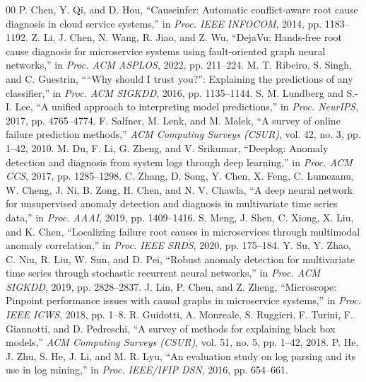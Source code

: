\documentclass[conference]{IEEEtran}
\begin{document}
\begin{thebibliography}{00}
 P. Chen, Y. Qi, and D. Hou, ``Causeinfer: Automatic conflict-aware root cause diagnosis in cloud service systems,'' in \textit{Proc. IEEE INFOCOM}, 2014, pp. 1183--1192.
 Z. Li, J. Chen, N. Wang, R. Jiao, and Z. Wu, ``DejaVu: Hands-free root cause diagnosis for microservice systems using fault-oriented graph neural networks,'' in \textit{Proc. ACM ASPLOS}, 2022, pp. 211--224.
 M. T. Ribeiro, S. Singh, and C. Guestrin, ````Why should I trust you?'': Explaining the predictions of any classifier,'' in \textit{Proc. ACM SIGKDD}, 2016, pp. 1135--1144.
 S. M. Lundberg and S.-I. Lee, ``A unified approach to interpreting model predictions,'' in \textit{Proc. NeurIPS}, 2017, pp. 4765--4774.
 F. Salfner, M. Lenk, and M. Malek, ``A survey of online failure prediction methods,'' \textit{ACM Computing Surveys (CSUR)}, vol. 42, no. 3, pp. 1--42, 2010.
 M. Du, F. Li, G. Zheng, and V. Srikumar, ``Deeplog: Anomaly detection and diagnosis from system logs through deep learning,'' in \textit{Proc. ACM CCS}, 2017, pp. 1285--1298.
 C. Zhang, D. Song, Y. Chen, X. Feng, C. Lumezanu, W. Cheng, J. Ni, B. Zong, H. Chen, and N. V. Chawla, ``A deep neural network for unsupervised anomaly detection and diagnosis in multivariate time series data,'' in \textit{Proc. AAAI}, 2019, pp. 1409--1416.
 S. Meng, J. Shen, C. Xiong, X. Liu, and K. Chen, ``Localizing failure root causes in microservices through multimodal anomaly correlation,'' in \textit{Proc. IEEE SRDS}, 2020, pp. 175--184.
 Y. Su, Y. Zhao, C. Niu, R. Liu, W. Sun, and D. Pei, ``Robust anomaly detection for multivariate time series through stochastic recurrent neural networks,'' in \textit{Proc. ACM SIGKDD}, 2019, pp. 2828--2837.
 J. Lin, P. Chen, and Z. Zheng, ``Microscope: Pinpoint performance issues with causal graphs in microservice systems,'' in \textit{Proc. IEEE ICWS}, 2018, pp. 1--8.
 R. Guidotti, A. Monreale, S. Ruggieri, F. Turini, F. Giannotti, and D. Pedreschi, ``A survey of methods for explaining black box models,'' \textit{ACM Computing Surveys (CSUR)}, vol. 51, no. 5, pp. 1--42, 2018.
 P. He, J. Zhu, S. He, J. Li, and M. R. Lyu, ``An evaluation study on log parsing and its use in log mining,'' in \textit{Proc. IEEE/IFIP DSN}, 2016, pp. 654--661.
\end{thebibliography}
\end{document}

